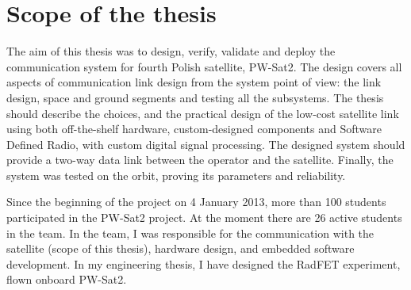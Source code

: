 \section{Scope of the thesis}
The aim of this thesis was to design, verify, validate and deploy the communication system for fourth Polish satellite, PW-Sat2. The design covers all aspects of communication link design from the system point of view: the link design, space and ground segments and testing all the subsystems. The thesis should describe the choices, and the practical design of the low-cost satellite link using both off-the-shelf hardware, custom-designed components and Software Defined Radio, with custom digital signal processing. The designed system should provide a two-way data link between the operator and the satellite. Finally, the system was tested on the orbit, proving its parameters and reliability.

Since the beginning of the project on 4 January 2013, more than 100 students participated in the PW-Sat2 project. At the moment there are 26 active students in the team. In the team, I was responsible for the communication with the satellite (scope of this thesis), hardware design, and embedded software development. In my engineering thesis, I have designed the RadFET experiment, flown onboard PW-Sat2.
